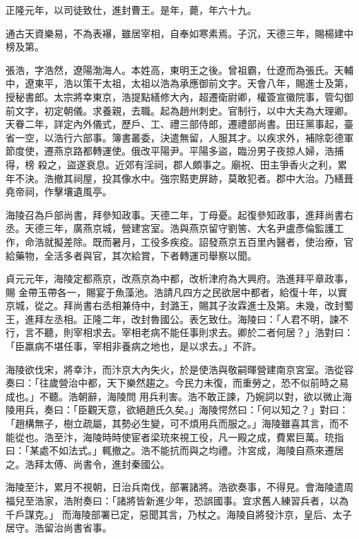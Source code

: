\begin{pinyinscope}
 正隆元年，以司徒致仕，進封曹王。是年，薨，年六十九。



 通古天資樂易，不為表襮，雖居宰相，自奉如寒素焉。子沉，天德三年，賜楊建中榜及第。



 張浩，字浩然，遼陽渤海人。本姓高，東明王之後。曾祖霸，仕遼而為張氏。天輔中，遼東平，浩以策干太祖，太祖以浩為承應御前文字。天會八年，賜進士及第，授秘書郎。太宗將幸東京，浩提點繕修大內，超遷衛尉卿，權簽宣徽院事，管勾御前文字，初定朝儀。求養親，去職。起為趙州刺史。官制行，以中大夫為大理卿。天眷二年，詳定內外儀式，歷戶、工、禮三部侍郎，遷禮部尚書。田玨黨事起，臺省一空，以浩行六部事。簿書叢委，決遣無留，人服其才。以疾求外，補除彰德軍節度使，遷燕京路都轉運使。俄改平陽尹。平陽多盜，臨汾男子夜掠人婦，浩捕得，榜
 殺之，盜遂衰息。近郊有淫祠，郡人頗事之。廟祝、田主爭香火之利，累年不決。浩撤其祠屋，投其像水中。強宗黠吏屏跡，莫敢犯者。郡中大治。乃繕葺堯帝祠，作擊壤遺風亭。



 海陵召為戶部尚書，拜參知政事。天德二年，丁母憂。起復參知政事，進拜尚書右丞。天德三年，廣燕京城，營建宮室。浩與燕京留守劉筈、大名尹盧彥倫監護工作，命浩就擬差除。既而暑月，工役多疾疫。詔發燕京五百里內醫者，使治療，官給藥物，全活多者與官，其次給賞，下者轉運司舉察以聞。



 貞元元年，海陵定都燕京，改燕京為中都，改析津府為大興府。浩進拜平章政事，賜
 金帶玉帶各一，賜宴于魚藻池。浩請凡四方之民欲居中都者，給復十年，以實京城，從之。拜尚書右丞相兼侍中，封潞王，賜其子汝霖進士及第。未幾，改封蜀王，進拜左丞相。正隆二年，改封魯國公。表乞致仕。海陵曰：「人君不明，諫不行，言不聽，則宰相求去。宰相老病不能任事則求去。卿於二者何居？」浩對曰：「臣羸病不堪任事，宰相非養病之地也，是以求去。」不許。



 海陵欲伐宋，將幸汴，而汴京大內失火，於是使浩與敬嗣暉營建南京宮室。浩從容奏曰：「往歲營治中都，天下樂然趨之。今民力未復，而重勞之，恐不似前時之易成也。」不聽。浩朝辭，海陵問
 用兵利害。浩不敢正諫，乃婉詞以對，欲以微止海陵用兵，奏曰：「臣觀天意，欲絕趙氏久矣。」海陵愕然曰：「何以知之？」對曰：「趙構無子，樹立疏屬，其勢必生變，可不煩用兵而服之。」海陵雖喜其言，而不能從也。浩至汴，海陵時時使宦者梁珫來視工役，凡一殿之成，費累巨萬。珫指曰：「某處不如法式。」輒撤之。浩不能抗而與之均禮。汴宮成，海陵自燕來遷居之。浩拜太傅、尚書令，進封秦國公。



 海陵至汴，累月不視朝，日治兵南伐，部署諸將。浩欲奏事，不得見。會海陵遣周福兒至浩家，浩附奏曰：「諸將皆新進少年，恐誤國事。宜求舊人練習兵者，以為千戶謀克。」
 而海陵部署已定，惡聞其言，乃杖之。海陵自將發汴京，皇后、太子居守。浩留治尚書省事。




\end{pinyinscope}
